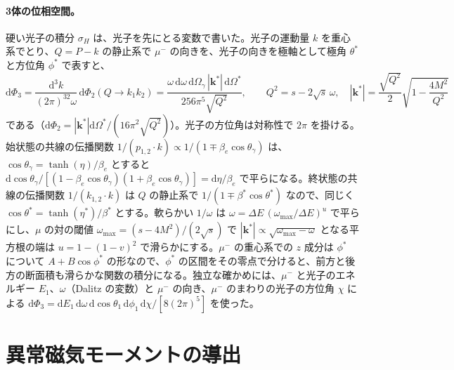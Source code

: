 \documentclass[a4paper,10pt]{ltjsarticle}
\newcommand{\dd}{\mathrm{d}}
\begin{document}
\paragraph{3体の位相空間。}硬い光子の積分 $\sigma_H$ は、光子を先にとる変数で書いた。光子の運動量 $k$ を重心系でとり、$Q=P-k$ の静止系で $\mu^-$ の向きを、光子の向きを極軸として極角 $\theta^*$ と方位角 $\phi^*$ で表すと、
\begin{equation*}
\dd\Phi_3=\frac{\dd^3k}{(2\pi)^32\omega}\,\dd\Phi_2(Q\to k_1k_2)=\frac{\omega\,\dd\omega\,\dd\Omega_\gamma\,|\boldsymbol k^*|\,\dd\Omega^*}{256\pi^5\sqrt{Q^2}},\qquad
Q^2=s-2\sqrt s\,\omega,\quad|\boldsymbol k^*|=\frac{\sqrt{Q^2}}{2}\sqrt{1-\frac{4M^2}{Q^2}}
\end{equation*}
である（$\dd\Phi_2=|\boldsymbol k^*|\dd\Omega^*/(16\pi^2\sqrt{Q^2})$）。光子の方位角は対称性で $2\pi$ を掛ける。始状態の共線の伝播関数 $1/(p_{1,2}\cdot k)\propto1/(1\mp\beta_e\cos\theta_\gamma)$ は、$\cos\theta_\gamma=\tanh(\eta)/\beta_e$ とすると $\dd\cos\theta_\gamma/[(1-\beta_e\cos\theta_\gamma)(1+\beta_e\cos\theta_\gamma)]=\dd\eta/\beta_e$ で平らになる。終状態の共線の伝播関数 $1/(k_{1,2}\cdot k)$ は $Q$ の静止系で $1/(1\mp\beta^*\cos\theta^*)$ なので、同じく $\cos\theta^*=\tanh(\eta^*)/\beta^*$ とする。軟らかい $1/\omega$ は $\omega=\Delta E\,(\omega_{\max}/\Delta E)^u$ で平らにし、$\mu$ の対の閾値 $\omega_{\max}=(s-4M^2)/(2\sqrt s)$ で $|\boldsymbol k^*|\propto\sqrt{\omega_{\max}-\omega}$ となる平方根の端は $u=1-(1-v)^2$ で滑らかにする。$\mu^-$ の重心系での $z$ 成分は $\phi^*$ について $A+B\cos\phi^*$ の形なので、$\phi^*$ の区間をその零点で分けると、前方と後方の断面積も滑らかな関数の積分になる。独立な確かめには、$\mu^-$ と光子のエネルギー $E_1$、$\omega$（Dalitz の変数）と $\mu^-$ の向き、$\mu^-$ のまわりの光子の方位角 $\chi$ による $\dd\Phi_3=\dd E_1\,\dd\omega\,\dd\cos\theta_1\,\dd\phi_1\,\dd\chi/[8(2\pi)^5]$ を使った。

\section{異常磁気モーメントの導出}\label{app:g2}
\end{document}
